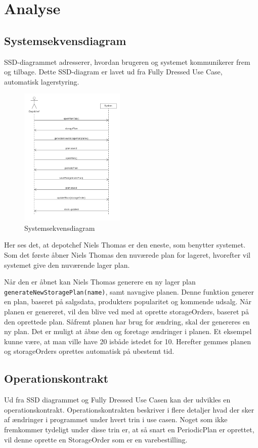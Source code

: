 \chapter{Analyse}\label{sec:analyse}

\section{Systemsekvensdiagram}
SSD-diagrammet adresserer, hvordan brugeren og systemet kommunikerer frem og tilbage. Dette SSD-diagram er lavet ud fra Fully Dressed Use Case, automatisk lagerstyring.

\begin{figure}
    \centering
    \includegraphics[width=50mm]{figures/analyse/SSD.png}
    \caption{Systemsekvensdiagram}
    \label{fig:ssd}
\end{figure}

Her ses det, at depotchef Niels Thomas er den eneste, som benytter systemet. Som det første åbner Niels Thomas den nuværede plan for lageret, hvorefter vil systemet give den nuværende lager plan. 

Når den er åbnet kan Niels Thomas generere en ny lager plan \verb|generateNewStoragePlan(name)|, samt navngive planen. Denne funktion generer en plan, baseret på salgsdata, produkters popularitet og kommende udsalg. Når planen er genereret, vil den blive ved med at oprette storageOrders, baseret på den oprettede plan. 
Såfremt planen har brug for ændring, skal der genereres en ny plan. Det er muligt at åbne den og foretage ændringer i planen. Et eksempel kunne være, at man ville have 20 isbåde istedet for 10. Herefter gemmes planen og storageOrders oprettes automatisk på ubestemt tid. 

 
\section{Operationskontrakt}
Ud fra SSD diagrammet og Fully Dressed Use Casen kan der udvikles en operationskontrakt. Operationskontrakten beskriver i flere detaljer hvad der sker af ændringer i programmet under hvert trin i use casen. Noget som ikke fremkommer tydeligt under disse trin er, at så snart en PeriodicPlan er oprettet, vil denne oprette en StorageOrder som er en varebestilling.

